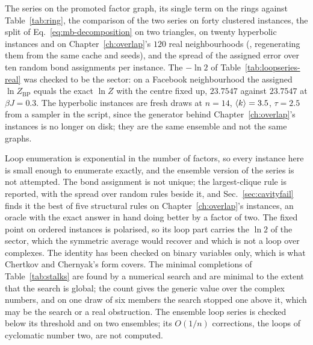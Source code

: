 The series on the promoted factor graph, its single term on the rings
against Table~\ref{tab:ring}, the comparison of the two series on forty
clustered instances, the split of Eq.~\eqref{eq:mb-decomposition} on two
triangles, on twenty hyperbolic instances and on Chapter~\ref{ch:overlap}'s
$120$ real neighbourhoods (, regenerating them from the
same cache and seeds), and the spread of the assigned error over ten random
bond assignments per instance. The $-\ln2$ of Table~\ref{tab:loopseries-real}
was checked to be the sector: on a Facebook neighbourhood the assigned
$\ln Z_{\mathrm{BP}}$ equals the exact $\ln Z$ with the centre fixed up,
$23.7547$ against $23.7547$ at $\beta J=0.3$. The hyperbolic instances
are fresh draws at $n=14$, $\langle k \rangle=3.5$, $\tau=2.5$ from a sampler in the
script, since the generator behind Chapter~\ref{ch:overlap}'s instances is
no longer on disk; they are the same ensemble and not the same graphs.

Loop enumeration is exponential in the number of factors, so every
instance here is small enough to enumerate exactly, and the ensemble
version of the series is not attempted. The bond assignment is not
unique; the largest-clique rule is reported, with the spread over random
rules beside it, and Sec.~\ref{sec:cavityfail} finds it the best of five
structural rules on Chapter~\ref{ch:overlap}'s instances, an oracle with
the exact answer in hand doing better by a factor of two. The
fixed point on ordered instances is polarised, so its loop part carries
the $\ln2$ of the sector, which the symmetric average would recover and
which is not a loop over complexes. The identity has been checked on
binary variables only, which is what Chertkov and Chernyak's form covers.
The minimal completions of Table~\ref{tab:stalks} are found by a
numerical search and are minimal to the extent that the search is
global; the count gives the generic value over the complex numbers, and
on one draw of six members the search stopped one above it, which may be
the search or a real obstruction. The ensemble loop series is checked
below its threshold and on two ensembles; its $O(1/n)$ corrections, the
loops of cyclomatic number two, are not computed.
